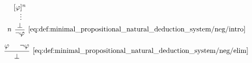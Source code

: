\begin{definition}
\begin{thmenum}
    \begin{minipage}{0.45\textwidth}
      \begin{equation*}\taglabel[\( \neg^+ \)]{eq:def:minimal_propositional_natural_deduction_system/neg/intro}
        \begin{prooftree}
          \hypo{ [\varphi]^n }
          \ellipsis {} { \bot }
          \infer[left label=\( n \)]1[\ref{eq:def:minimal_propositional_natural_deduction_system/neg/intro}]{ \neg \varphi }
        \end{prooftree}
      \end{equation*}
    \end{minipage}
    \hfill
    \begin{minipage}{0.45\textwidth}
      \begin{equation*}\taglabel[\( \neg^- \)]{eq:def:minimal_propositional_natural_deduction_system/neg/elim}
        \begin{prooftree}
          \hypo{ \varphi }
          \hypo{ \neg \varphi }
          \infer2[\ref{eq:def:minimal_propositional_natural_deduction_system/neg/elim}]{ \bot }
        \end{prooftree}
      \end{equation*}
    \end{minipage}
  \end{thmenum}
\end{definition}
